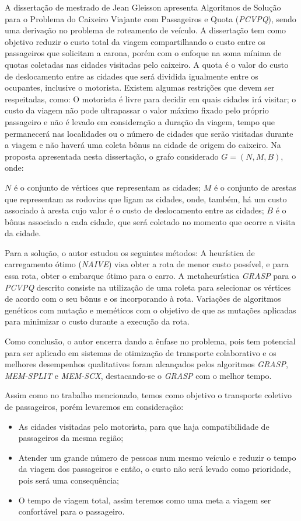 A dissertação de mestrado de Jean Gleisson apresenta Algoritmos de Solução para o Problema do Caixeiro Viajante com Passageiros e Quota (\emph{PCVPQ}), sendo uma derivação no problema de roteamento de veículo. A dissertação tem como objetivo reduzir o custo total da viagem compartilhando o custo entre os passageiros que solicitam a carona, porém com o enfoque na soma mínima de quotas coletadas nas cidades visitadas pelo caixeiro. A quota é o valor do custo de deslocamento entre as cidades que será dividida igualmente entre os ocupantes, inclusive o motorista.
Existem algumas restrições que devem ser respeitadas, como: O motorista é livre para decidir em quais cidades irá visitar; o custo da viagem não pode ultrapassar o valor máximo fixado pelo próprio passageiro e não é levado em consideração a duração da viagem, tempo que permanecerá nas localidades ou o número de cidades que serão visitadas durante a viagem e não haverá uma coleta bônus na cidade de origem do caixeiro.
Na proposta apresentada nesta dissertação, o grafo considerado $G = (N, M, B)$, onde:

$N$ é o conjunto de vértices que representam as cidades;
$M$ é o conjunto de arestas que representam as rodovias que ligam as cidades, onde, também, há um custo associado à aresta cujo valor é o custo de deslocamento entre as cidades;
$B$ é o bônus associado a cada cidade, que será coletado no momento que ocorre a visita da cidade.

Para a solução, o autor estudou os seguintes métodos:
A heurística de carregamento ótimo (\emph{NAIVE}) visa obter a rota de menor custo possível, e para essa rota, obter o embarque ótimo para o carro.
A metaheurística \emph{GRASP} para o \emph{PCVPQ} descrito consiste na utilização de uma roleta para selecionar os vértices de acordo com o seu bônus e os incorporando à rota.
Variações de algoritmos genéticos com mutação e meméticos com o objetivo de que as mutações aplicadas para minimizar o custo durante a execução da rota.

Como conclusão, o autor encerra dando a ênfase no problema, pois tem potencial para ser aplicado em sistemas de otimização de transporte colaborativo e os melhores desempenhos qualitativos foram alcançados pelos algoritmos \emph{GRASP}, \emph{MEM-SPLIT} e \emph{MEM-SCX}, destacando-se o \emph{GRASP} com o melhor tempo.

Assim como no trabalho mencionado, temos como objetivo o transporte coletivo de passageiros, porém levaremos em consideração:
\begin{itemize}
    \item As cidades visitadas pelo motorista, para que haja compatibilidade de passageiros da mesma região;
    \item Atender um grande número de pessoas num mesmo veículo e reduzir o tempo da viagem dos passageiros e então, o custo não será levado como prioridade, pois será uma consequência;
    \item O tempo de viagem total, assim teremos como uma meta a viagem ser confortável para o passageiro.
\end{itemize}

